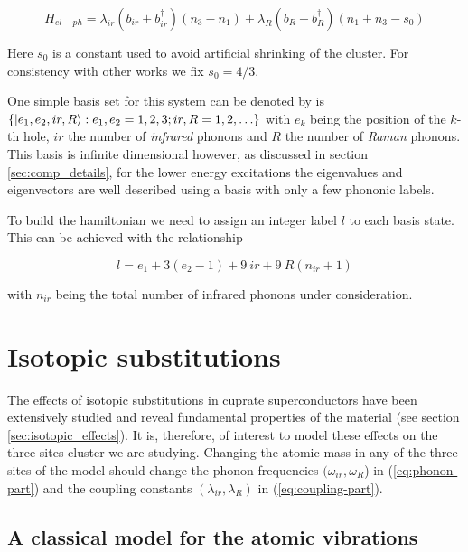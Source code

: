 \begin{equation}
  \label{eq:coupling-part}
  H_{el-ph} = \lambda_{ir}(b_{ir} + b_{ir}^\dagger)(n_3 - n_1) + \lambda_R (b_R + b_R^\dagger)(n_1 + n_3-s_0)
\end{equation}

Here $s_0$ is a constant used to avoid artificial shrinking of the cluster. 
For consistency with other works \cite{MustredeLeon1992,DeLeon1999,Leon2008,MirandaMena2007} we fix $s_0=4/3$.


One simple basis set for this system can be denoted by is $\{\left | e_1,e_2,ir,R \right\rangle: e_1,e_2=1,2,3; ir,R=1,2,\ldots\}$ with $e_k$ being the position of the $k$-th hole, $ir$ the number of \textit{infrared} phonons and $R$ the number of \textit{Raman} phonons. 
This basis is infinite dimensional however, as discussed in section \ref{sec:comp_details}, for the lower energy excitations the eigenvalues and eigenvectors are well described using a basis with only a few phononic labels.

To build the hamiltonian we need to assign an integer label $l$ to each basis state. 
This can be achieved with the relationship

\begin{equation}
  \label{eq:label}
  l = e_1 + 3(e_2 - 1) + 9\ ir + 9\ R (n_{ir} +1)
\end{equation}

\noindent with $n_{ir}$ being the total number of infrared phonons under consideration.

\section{Isotopic substitutions}
\label{sec:isotopic-model}

The effects of isotopic substitutions in cuprate superconductors have been extensively studied and reveal fundamental properties of the material (see section \ref{sec:isotopic_effects}). 
It is, therefore, of interest to model these effects on the three sites cluster we are studying.
Changing the atomic mass in any of the three sites of the model should change the phonon frequencies $(\omega_{ir},\omega_R$) in (\ref{eq:phonon-part}) and the coupling constants $(\lambda_{ir},\lambda_R)$ in (\ref{eq:coupling-part}).

\subsection{A classical model for the atomic vibrations}

